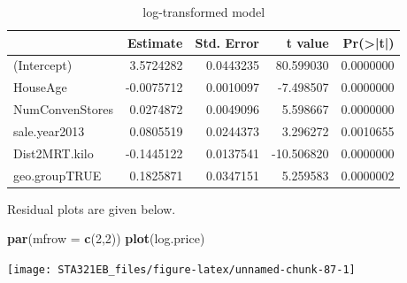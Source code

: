 \documentclass[
]{book}
\newenvironment{Shaded}{\begin{snugshade}}{\end{snugshade}}
\newcommand{\AttributeTok}[1]{\textcolor[rgb]{0.13,0.29,0.53}{#1}}
\newcommand{\DecValTok}[1]{\textcolor[rgb]{0.00,0.00,0.81}{#1}}
\newcommand{\FunctionTok}[1]{\textcolor[rgb]{0.13,0.29,0.53}{\textbf{#1}}}
\newcommand{\NormalTok}[1]{#1}
\newcommand{\OtherTok}[1]{\textcolor[rgb]{0.56,0.35,0.01}{#1}}
\newcommand{\SpecialCharTok}[1]{\textcolor[rgb]{0.81,0.36,0.00}{\textbf{#1}}}
\newcommand{\StringTok}[1]{\textcolor[rgb]{0.31,0.60,0.02}{#1}}
\begin{document}
\begin{Shaded}
\end{Shaded}

\begin{table}

\caption{\label{tab:unnamed-chunk-86}log-transformed model}
\centering
\begin{tabular}[t]{l|r|r|r|r}
\hline
  & Estimate & Std. Error & t value & Pr(>|t|)\\
\hline
(Intercept) & 3.5724282 & 0.0443235 & 80.599030 & 0.0000000\\
\hline
HouseAge & -0.0075712 & 0.0010097 & -7.498507 & 0.0000000\\
\hline
NumConvenStores & 0.0274872 & 0.0049096 & 5.598667 & 0.0000000\\
\hline
sale.year2013 & 0.0805519 & 0.0244373 & 3.296272 & 0.0010655\\
\hline
Dist2MRT.kilo & -0.1445122 & 0.0137541 & -10.506820 & 0.0000000\\
\hline
geo.groupTRUE & 0.1825871 & 0.0347151 & 5.259583 & 0.0000002\\
\hline
\end{tabular}
\end{table}

Residual plots are given below.

\begin{Shaded}
\begin{Highlighting}[]
\FunctionTok{par}\NormalTok{(}\AttributeTok{mfrow =} \FunctionTok{c}\NormalTok{(}\DecValTok{2}\NormalTok{,}\DecValTok{2}\NormalTok{))}
\FunctionTok{plot}\NormalTok{(log.price)}
\end{Highlighting}
\end{Shaded}

\begin{center}\texttt{[image: STA321EB\_files/figure-latex/unnamed-chunk-87-1]} \end{center}
\end{document}
